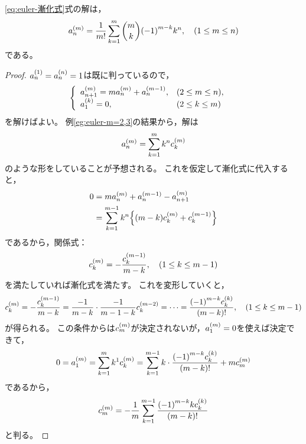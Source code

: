 \documentclass[a4paper,draft]{ltjsarticle}
\begin{document}
\begin{thm}
    \eqref{eq:euler-漸化式}式の解は，
    \begin{equation}
        a_n^{\pare{m}}=\frac{1}{m!}\sum_{k=1}^m\binom{m}{k}\pare{-1}^{m-k} k^n,\quad\pare{1\leq m \leq n}
    \end{equation}
    である。

    \begin{proof}
        $a_n^{\pare{1}}=a_n^{\pare{n}}=1$は既に判っているので，
        \begin{align}
            \begin{cases}
                \begin{array}{ll}
                    a_{n+1}^{\pare{m}}=m a_n^{\pare{m}}+a_{n}^{\pare{m-1}}, &\pare{2\leq m \leq n},\\
                    a_1^{\pare{k}}=0, &\pare{2\leq k\leq m}
                \end{array} 
            \end{cases}
        \end{align}
        を解けばよい。
        例\ref{eg:euler-m=2,3}の結果から，解は
        \begin{equation}
            a_n^{\pare{m}}=\sum_{k=1}^m k^n c_k^{\pare{m}}
            \label{eq:euler-a_n^(m)-defi}
        \end{equation}
        のような形をしていることが予想される。
        これを仮定して漸化式に代入すると，
        \begin{align}
            0&=ma_n^{\pare{m}}+a_n^{\pare{m-1}}-a_{n+1}^{\pare{m}}
            \\
            &=\sum_{k=1}^{m-1}k^n \bra{\pare{m-k}c_k^{\pare{m}}+c_k^{\pare{m-1}}}
        \end{align}
        であるから，関係式：
        \begin{equation}
            c_k^{\pare{m}}=-\frac{c_k^{\pare{m-1}}}{m-k}, \quad\pare{1\leq k \leq m-1}
        \end{equation}
        を満たしていれば漸化式を満たす。
        これを変形していくと，
        \begin{equation}
            c_k^{\pare{m}}=-\frac{c_k^{\pare{m-1}}}{m-k}=\frac{-1}{m-k}\cdot \frac{-1}{m-1-k} c_k^{\pare{m-2}}=\cdots=\frac{\pare{-1}^{m-k}c_k^{\pare{k}}}{\pare{m-k}!},\quad\pare{1\leq k\leq m-1}
            \label{eq:euler-c_k^(m)}
        \end{equation}
        が得られる。
        この条件からは$c_m^{\pare{m}}$が決定されないが，$a_1^{\pare{m}}=0$を使えば決定できて，
        \begin{align}
            0=a_1^{\pare{m}}=\sum_{k=1}^m k^1 c_k^{\pare{m}}=\sum_{k=1}^{m-1} k\cdot \frac{\pare{-1}^{m-k}c_k^{\pare{k}}}{\pare{m-k}!}
            +mc_m^{\pare{m}}
        \end{align}
        であるから，
        \begin{equation}
            c_m^{\pare{m}}=-\frac{1}{m}\sum_{k=1}^{m-1}\frac{\pare{-1}^{m-k}k c_k^{\pare{k}}}{\pare{m-k}!}
            \label{eq:euler-c_m^(m)}
        \end{equation}
        と判る。


\end{proof}
\end{thm}
\end{document}
